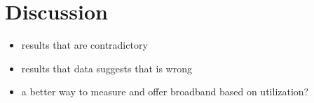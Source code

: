 \section{Discussion}
\label{sec:discussion}

\begin{itemize}
\itemsep0em
\item results that are contradictory
\item results that data suggests that is wrong
\item a better way to measure and offer broadband based on utilization?
\end{itemize}